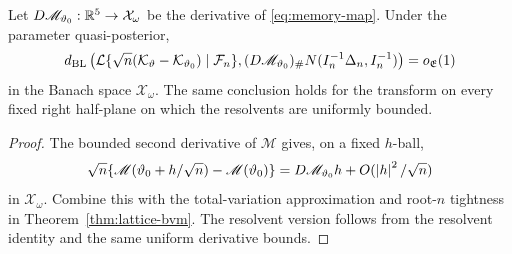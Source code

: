 \begin{corollary}
\label{cor:memory-posterior}
Let \(D\mathscr M_{\vartheta_0}:\mathbb R^5\to\mathcal X_\omega\) be the derivative
of \eqref{eq:memory-map}.  Under the parameter quasi-posterior,
\begin{equation}
 d_{\mathrm{BL}}\left(
 \mathcal L\{\sqrt n(\mathcal K_\vartheta-
 \mathcal K_{\vartheta_0})\mid\mathcal F_n\},
 (D\mathscr M_{\vartheta_0})_\#
 N(I_n^{-1}\Delta_n,I_n^{-1})
 \right)=o_{\mathfrak E}(1)
 \label{eq:memory-posterior}
\end{equation}
in the Banach space \(\mathcal X_\omega\).  The same conclusion holds for
the transform on every fixed right half-plane on which the resolvents are
uniformly bounded.
\end{corollary}

\begin{proof}
The bounded second derivative of \(\mathscr M\) gives, on a fixed \(h\)-ball,
\[
 \sqrt n\{\mathscr M(\vartheta_0+h/\sqrt n)-
 \mathscr M(\vartheta_0)\}
 =D\mathscr M_{\vartheta_0}h+O(\left|h\right|^2/\sqrt n)
\]
in \(\mathcal X_\omega\).  Combine this with the total-variation
approximation and root-\(n\) tightness in
Theorem~\ref{thm:lattice-bvm}.  The resolvent version follows from the
resolvent identity and the same uniform derivative bounds.
\end{proof}
